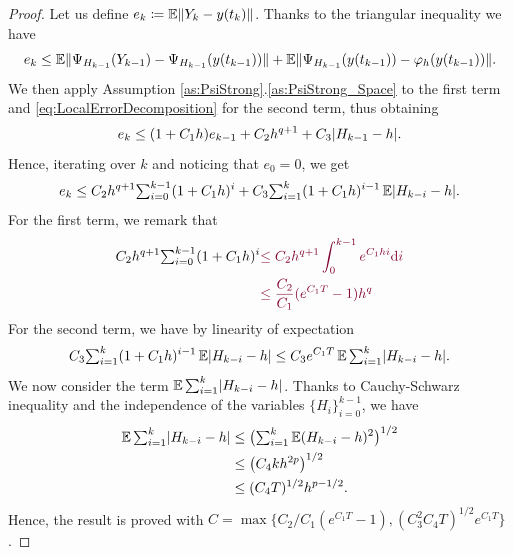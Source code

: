 \documentclass{siamart1116}
\numberwithin{theorem}{section}
\DeclarePairedDelimiter{\abs}{\lvert}{\rvert}
\DeclarePairedDelimiter{\norm}{\|}{\|}
\renewcommand{\phi}{\varphi}
\newcommand{\defeq}{\coloneqq}
\newcommand{\E}{\operatorname{\mathbb{E}}}
\newcommand{\sksum}{{\textstyle\sum}}
\newcommand{\dd}{\mathrm{d}}
\newcommand{\corr}[1]{{\color{bordeaux}#1}}
\begin{document}
\begin{proof} Let us define $e_k \defeq \E\norm{Y_k - y(t_k)}$. Thanks to the triangular inequality we have
	\begin{equation}
		e_k \leq \E\norm{\Psi_{H_{k-1}}(Y_{k-1}) - \Psi_{H_{k-1}}(y(t_{k-1}))} + \E\norm{\Psi_{H_{k-1}}(y(t_{k-1})) - \phi_{h}(y(t_{k-1}))}.
	\end{equation}
	 We then apply Assumption \ref{as:PsiStrong}.\ref{as:PsiStrong_Space} to the first term and \eqref{eq:LocalErrorDecomposition}  for the second term, thus obtaining
	\begin{equation}
		e_k \leq (1 + C_1h) e_{k - 1} + C_2 h^{q + 1} + C_3 \abs{H_{k-1} - h}.
	\end{equation}
	Hence, iterating over $k$ and noticing that $e_0 = 0$, we get
	\begin{equation}
		e_k \leq C_2 h^{q + 1} \sksum_{i=0}^{k-1} (1 + C_1h)^i + C_3 \sksum_{i=1}^{k} (1 + C_1h)^{i-1}\E\abs{H_{k-i} - h}.
	\end{equation}
	For the first term, we remark that
	\begin{equation}
	\begin{aligned}
		C_2 h^{q + 1} \sksum_{i=0}^{k-1} (1 + C_1h)^i  &\corr{\leq C_2 h^{q+1} \int_{0}^{k-1}e^{C_1 h i}\dd i} \\
			&\corr{\leq \frac{C_2}{C_1} (e^{C_1T} - 1)h^q}
	\end{aligned}
	\end{equation}
	For the second term, we have by linearity of expectation
	\begin{equation}
		C_3 \sksum_{i=1}^{k} (1 + C_1h)^{i-1}\E\abs{H_{k-i} - h} \leq C_3 e^{C_1 T} \E \sksum_{i=1}^k \abs{H_{k-i} - h}.
	\end{equation}
	We now consider the term $\E \sksum_{i=1}^k \abs{H_{k-i} - h}$. Thanks to Cauchy-Schwarz inequality and the independence of the variables $\{H_i\}_{i=0}^{k-1}$, we have
	\begin{equation}
	\begin{aligned}
		\E \sksum_{i=1}^k \abs{H_{k-i} - h} &\leq \big(\sksum_{i=1}^k \E(H_{k-i} - h)^2\big)^{1/2} \\
		&\leq \big(C_4 k h^{2p}\big)^{1/2} \\
	    &\leq (C_4T)^{1/2} h^{p - 1/2}.
	\end{aligned}
	\end{equation}
	Hence, the result is proved with \corr{$C = \max\{C_2/C_1(e^{C_1T} - 1), (C_3^2C_4T)^{1/2}e^{C_1T}\}$}.
\end{proof}
\end{document}
